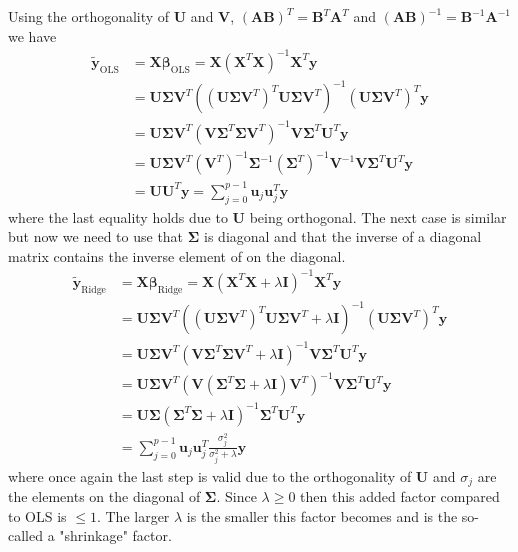 \documentclass{article}
\begin{document}
\begin{enumerate}[a)]
		Using the orthogonality of $\bm U$ and $\bm V$, $(\bm{AB})^T=\bm B^T\bm A^T$ and $(\bm{AB})^{-1}=\bm B^{-1}\bm A^{-1}$ we have
		\begin{align*}
			\tilde{\bm{y}}_\text{OLS}&=\bm{X\beta}_\text{OLS}=\bm{X}(\bm{X}^T\bm{X})^{-1}\bm{X}^T\bm{y}\\
			&=\bm{U\Sigma V}^T((\bm{U\Sigma V}^T)^T\bm{U\Sigma V}^T)^{-1}(\bm{U\Sigma V}^T)^T\bm{y}\\
			&=\bm{U\Sigma V}^T(\bm{V}\bm{\Sigma}^T\bm{\Sigma}\bm{V}^T)^{-1}\bm{V}\bm{\Sigma}^T\bm{U}^T\bm{y}\\
			&=\bm{U\Sigma V}^T(\bm{V}^T)^{-1}\bm{\Sigma}^{-1}(\bm{\Sigma}^T)^{-1}\bm{V}^{-1}\bm{V}\bm{\Sigma}^T\bm{U}^T\bm{y}\\
			&=\bm{U}\bm{U}^T\bm{y}=\sum_{j=0}^{p-1}\bm{u}_j\bm{u}_j^T\bm{y}
		\end{align*}
		where the last equality holds due to $\bm U$ being orthogonal. The next case is similar but now we need to use that $\bm\Sigma$ is diagonal and that the inverse of a diagonal matrix contains the inverse element of on the diagonal.
		\begin{align*}
			\tilde{\bm{y}}_\text{Ridge}&=\bm{X\beta}_\text{Ridge}=\bm{X}(\bm{X}^T\bm{X}+\lambda\bm I)^{-1}\bm{X}^T\bm{y}\\
			&=\bm{U\Sigma V}^T((\bm{U\Sigma V}^T)^T\bm{U\Sigma V}^T+\lambda\bm I)^{-1}(\bm{U\Sigma V}^T)^T\bm{y}\\
			&=\bm{U\Sigma V}^T(\bm{V}\bm{\Sigma}^T\bm{\Sigma}\bm{V}^T+\lambda\bm I)^{-1}\bm{V}\bm{\Sigma}^T\bm{U}^T\bm{y}\\
			&=\bm{U\Sigma V}^T(\bm{V}({\bm\Sigma}^T\bm{\Sigma}+\lambda\bm I)\bm{V}^T)^{-1}\bm{V}\bm{\Sigma}^T\bm{U}^T\bm{y}\\
			&=\bm{U\Sigma }({\bm\Sigma}^T\bm{\Sigma}+\lambda\bm I)^{-1}\bm{\Sigma}^T\bm{U}^T\bm{y}\\
			&=\sum_{j=0}^{p-1}\bm{u}_j\bm{u}_j^T\frac{\sigma_j^2}{\sigma_j^2+\lambda}\bm{y}
		\end{align*}
		where once again the last step is valid due to the orthogonality of $\bm U$ and $\sigma_j$ are the elements on the diagonal of $\bm\Sigma$. Since $\lambda\geq0$ then this added factor compared to OLS is $\leq1$. The larger $\lambda$ is the smaller this factor becomes and is the so-called a "shrinkage" factor. 
	\end{enumerate}
	
\end{document}
